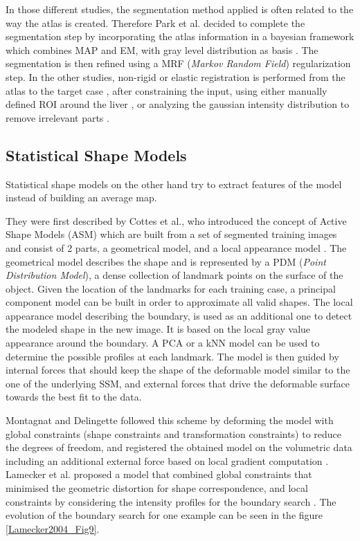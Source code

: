 \documentclass[]{article}
\begin{document}
In those different studies, the segmentation method applied is often
related to the way the atlas is created. Therefore Park et al. decided to complete the segmentation step by incorporating the
atlas information in a bayesian framework which combines MAP and EM,
with gray level distribution as basis \cite{Park2003}. The segmentation is then refined
using a MRF (\emph{Markov Random Field}) regularization step. In the
other studies, non-rigid or elastic registration is performed from the
atlas to the target case \cite{Slagmolen2007, Linguraru2009, Li2010}, after constraining the input, using either manually defined
ROI around the liver \cite{Slagmolen2007}, or analyzing the gaussian intensity distribution to
remove irrelevant parts \cite{Li2010}.

\subsection*{Statistical Shape Models}

Statistical shape models on the other hand try to extract features of
the model instead of building an average map.

They were first described by Cottes et al., who introduced the concept of Active Shape Models (ASM) which
are built from a set of segmented training images and consist of 2
parts, a geometrical model, and a local appearance model \cite{Cottes1995}. The
geometrical model describes the shape and is represented by a PDM
(\emph{Point Distribution Model}), a dense collection of landmark points
on the surface of the object. Given the location of the landmarks for
each training case, a principal component model can be built in order to
approximate all valid shapes. The local appearance model describing the
boundary, is used as an additional one to detect the modeled shape in
the new image. It is based on the local gray value appearance around the
boundary. A PCA or a kNN model can be used to determine the possible
profiles at each landmark. The model is then guided by internal
forces that should keep the shape of the deformable model similar to the
one of the underlying SSM, and external forces that drive the deformable
surface towards the best fit to the data.

Montagnat and Delingette followed this scheme by deforming the model with
global constraints (shape constraints and transformation constraints) to
reduce the degrees of freedom, and registered the obtained model on the
volumetric data including an additional external force based on local
gradient computation \cite{Montagnat1997}.
Lamecker et al. proposed a model that combined global constraints that
minimised the geometric distortion for shape correspondence, and local
constraints by considering the intensity profiles for the boundary
search \cite{Lamecker2004}. The evolution of the boundary search for one example can be seen in the figure \ref{Lamecker2004_Fig9}.
\end{document}
